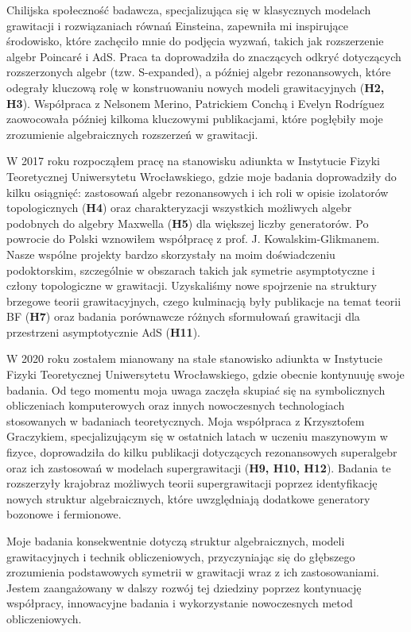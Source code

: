 \documentclass[12pt,a4paper]{article}
\begin{document}
Chilijska społeczność badawcza, specjalizująca się w klasycznych modelach grawitacji i rozwiązaniach równań Einsteina, zapewniła mi inspirujące środowisko, które zachęciło mnie do podjęcia wyzwań, takich jak rozszerzenie algebr Poincar\'e i AdS. Praca ta doprowadziła do znaczących odkryć dotyczących rozszerzonych algebr (tzw. S-expanded), a później algebr rezonansowych, które odegrały kluczową rolę w konstruowaniu nowych modeli grawitacyjnych (\textbf{H2, H3}). Współpraca z Nelsonem Merino, Patrickiem Conchą i Evelyn Rodríguez zaowocowała później kilkoma kluczowymi publikacjami, które pogłębiły moje zrozumienie algebraicznych rozszerzeń w grawitacji.

W 2017 roku rozpocząłem pracę na stanowisku adiunkta w Instytucie Fizyki Teoretycznej Uniwersytetu Wrocławskiego, gdzie moje badania doprowadziły do kilku osiągnięć: zastosowań algebr rezonansowych i ich roli w opisie izolatorów topologicznych (\textbf{H4}) oraz charakteryzacji wszystkich możliwych algebr podobnych do algebry Maxwella (\textbf{H5}) dla większej liczby generatorów. Po powrocie do Polski wznowiłem współpracę z prof. J. Kowalskim-Glikmanem. Nasze wspólne projekty bardzo skorzystały na moim doświadczeniu podoktorskim, szczególnie w obszarach takich jak symetrie asymptotyczne i człony topologiczne w grawitacji. Uzyskaliśmy nowe spojrzenie na struktury brzegowe teorii grawitacyjnych, czego kulminacją były publikacje na temat teorii BF (\textbf{H7}) oraz badania porównawcze różnych sformułowań grawitacji dla przestrzeni asymptotycznie AdS (\textbf{H11}).

W 2020 roku zostałem mianowany na stałe stanowisko adiunkta w Instytucie Fizyki Teoretycznej Uniwersytetu Wrocławskiego, gdzie obecnie kontynuuję swoje badania. Od tego momentu moja uwaga zaczęła skupiać się na symbolicznych obliczeniach komputerowych oraz innych nowoczesnych technologiach stosowanych w badaniach teoretycznych. Moja współpraca z Krzysztofem Graczykiem, specjalizującym się w ostatnich latach w uczeniu maszynowym w fizyce, doprowadziła do kilku publikacji dotyczących rezonansowych superalgebr oraz ich zastosowań w modelach supergrawitacji (\textbf{H9, H10, H12}). Badania te rozszerzyły krajobraz możliwych teorii supergrawitacji poprzez identyfikację nowych struktur algebraicznych, które uwzględniają dodatkowe generatory bozonowe i fermionowe.

Moje badania konsekwentnie dotyczą struktur algebraicznych, modeli grawitacyjnych i technik obliczeniowych, przyczyniając się do głębszego zrozumienia podstawowych symetrii w grawitacji wraz z ich zastosowaniami. Jestem zaangażowany w dalszy rozwój tej dziedziny poprzez kontynuację współpracy, innowacyjne badania i wykorzystanie nowoczesnych metod obliczeniowych.
\end{document}
